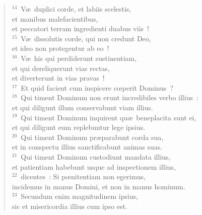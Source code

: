 \begin{verse}${}^{14}$~V\ae\ duplici corde, et labiis scelestis,\\ et manibus malefacientibus,\\ et peccatori terram ingredienti duabus viis~!\\
${}^{15}$~V\ae\ dissolutis corde, qui non credunt Deo,\\ et ideo non protegentur ab eo~!\\
${}^{16}$~V\ae\ his qui perdiderunt sustinentiam,\\ et qui dereliquerunt vias rectas,\\ et diverterunt in vias pravas~!\\
${}^{17}$~Et quid facient cum inspicere cœperit Dominus~?\\
${}^{18}$~Qui timent Dominum non erunt incredibiles verbo illius~:\\ et qui diligunt illum conservabunt viam illius.\\
${}^{19}$~Qui timent Dominum inquirent qu\ae\ beneplacita sunt ei,\\ et qui diligunt eum replebuntur lege ipsius.\\
${}^{20}$~Qui timent Dominum pr\ae parabunt corda sua,\\ et in conspectu illius sanctificabunt animas suas.\\
${}^{21}$~Qui timent Dominum custodiunt mandata illius,\\ et patientiam habebunt usque ad inspectionem illius,\\
${}^{22}$~dicentes~: Si pœnitentiam non egerimus,\\ incidemus in manus Domini, et non in manus hominum.\\
${}^{23}$~Secundum enim magnitudinem ipsius,\\ sic et misericordia illius cum ipso est.\end{verse}


